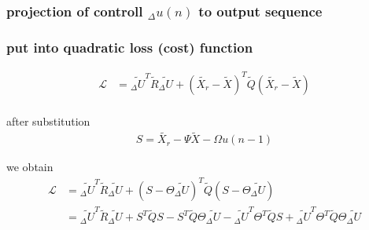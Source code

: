 \documentclass{beamer}
\begin{document}
\begin{frame}
  
  \frametitle{\bf projection of controll $_\Delta u(n)$ to output sequence}


\end{frame}




\begin{frame}
  
  \frametitle{\bf put into quadratic loss (cost) function}

  \begin{align*}
    \mathcal{L} &= \tilde{_\Delta U}^T \tilde{R} \tilde{_\Delta U} 
                + (\tilde{X_r} - \tilde{X})^T \tilde{Q} (\tilde{X_r} - \tilde{X}) \\
  \end{align*}

  after substitution
  \begin{align*}
    S = \tilde{X_r} - \Psi\tilde{X} - \Omega u(n-1)
  \end{align*}

  we obtain
  \begin{align*}
    \mathcal{L} &= \tilde{_\Delta U}^T \tilde{R} \tilde{_\Delta U} + (S -  \Theta \tilde{_\Delta U} )^T \tilde{Q} (S -  \Theta \tilde{_\Delta U} ) \\
                &= \tilde{_\Delta U}^T \tilde{R} \tilde{_\Delta U} 
                + S^T\tilde{Q}S - S^T \tilde{Q} \Theta \tilde{_\Delta U} 
                - \tilde{_\Delta U}^T \Theta^T\tilde{Q}S + \tilde{_\Delta U}^T\Theta^T\tilde{Q}\Theta\tilde{_\Delta U}
  \end{align*}

\end{frame}
\end{document}
